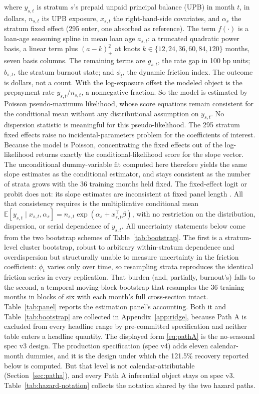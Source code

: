 \documentclass[12pt]{article}
\begin{document}
where $y_{s,t}$ is stratum $s$'s prepaid unpaid principal balance (UPB) in month $t$, in dollars, $n_{s,t}$ its UPB exposure, $x_{s,t}$ the right-hand-side covariates, and $\alpha_{s}$ the stratum fixed effect (295 enter, one absorbed as reference). The term $f(\cdot)$ is a loan-age seasoning spline in mean loan age $a_{s,t}$: a truncated quadratic power basis, a linear term plus $(a - k)_+^2$ at knots $k \in \{12, 24, 36, 60, 84, 120\}$ months, seven basis columns. The remaining terms are $g_{s,t}$, the rate gap in 100 bp units; $b_{s,t}$, the stratum burnout state; and $\phi_t$, the dynamic friction index. The outcome is dollars, not a count. With the log-exposure offset the modeled object is the prepayment rate $y_{s,t}/n_{s,t}$, a nonnegative fraction. So the model is estimated by Poisson pseudo-maximum likelihood, whose score equations remain consistent for the conditional mean without any distributional assumption on $y_{s,t}$. No dispersion statistic is meaningful for this pseudo-likelihood. The 295 stratum fixed effects raise no incidental-parameters problem for the coefficients of interest. Because the model is Poisson, concentrating the fixed effects out of the log-likelihood returns exactly the conditional-likelihood score for the slope vector. The unconditional dummy-variable fit computed here therefore yields the same slope estimates as the conditional estimator, and stays consistent as the number of strata grows with the 36 training months held fixed. The fixed-effect logit or probit does not: its slope estimates are inconsistent at fixed panel length \citep{wooldridge1999}. All that consistency requires is the multiplicative conditional mean $\mathbb{E}[y_{s,t}\mid x_{s,t},\alpha_{s}] = n_{s,t}\exp(\alpha_{s} + x_{s,t}^{\top}\beta)$, with no restriction on the distribution, dispersion, or serial dependence of $y_{s,t}$. All uncertainty statements below come from the two bootstrap schemes of Table~\ref{tab:bootstrap}. The first is a stratum-level cluster bootstrap, robust to arbitrary within-stratum dependence and overdispersion but structurally unable to measure uncertainty in the friction coefficient: $\phi_t$ varies only over time, so resampling strata reproduces the identical friction series in every replication. That burden (and, partially, burnout's) falls to the second, a temporal moving-block bootstrap that resamples the 36 training months in blocks of six with each month's full cross-section intact. Table~\ref{tab:panel} reports the estimation panel's accounting. Both it and Table~\ref{tab:bootstrap} are collected in Appendix~\ref{app:ridge}, because Path A is excluded from every headline range by pre-committed specification and neither table enters a headline quantity. The displayed form \eqref{eq:pathA} is the no-seasonal spec v3 design. The production specification (spec v4) adds eleven calendar-month dummies, and it is the design under which the 121.5\% recovery reported below is computed. But that level is not calendar-attributable (Section~\ref{sec:patha}), and every Path A inferential object stays on spec v3. Table~\ref{tab:hazard-notation} collects the notation shared by the two hazard paths.
\end{document}

